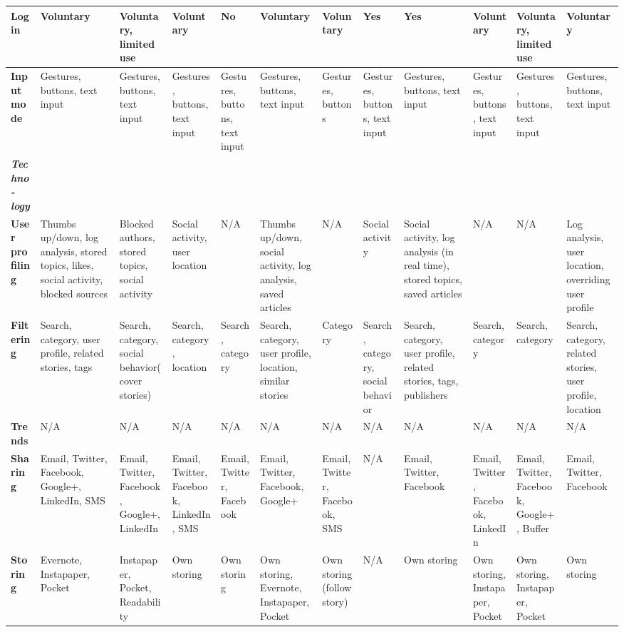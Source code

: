 \begin{landscape}
\begin{center}
\begin{longtable}{ | p{1.6cm} | p{1.6cm} | p{1.6cm} | p{1.6cm} | p{1.6cm} | p{1.6cm} | p{1.6cm} | p{1.6cm} | p{1.6cm} | p{1.6cm} | p{1.6cm} | p{1.6cm} |}
\textbf{Login} & Voluntary & Voluntary, limited use & Voluntary & No & Voluntary & Voluntary & Yes & Yes & Voluntary & Voluntary, limited use & Voluntary \\ \hline

\textbf{Input mode} & Gestures, buttons, text input & Gestures, buttons, text input & Gestures, buttons, text input & Gestures, buttons, text input & Gestures, buttons, text input & Gestures, buttons & Gestures, buttons, text input & Gestures, buttons, text input & Gestures, buttons, text input & Gestures, buttons, text input & Gestures, buttons, text input \\ \hline

\textit{\textbf{Techno-logy}} &&&&&&&&&&& \\ \hline

\textbf{User profiling} & Thumbs up/down, log analysis, stored topics, likes, social activity, blocked sources & Blocked authors, stored topics, social activity & Social activity, user location & N/A & Thumbs up/down, social activity, log analysis, saved articles & N/A & Social activity & Social activity, log analysis (in real time), stored topics, saved articles & N/A & N/A & Log analysis, user location, overriding user profile \\ \hline

\textbf{Filtering} & Search, category, user profile, related stories, tags & Search, category, social behavior(cover stories) & Search, category, location & Search, category & Search, category, user profile, location, similar stories & Category & Search, category, social behavior & Search, category, user profile, related stories, tags, publishers & Search, category & Search, category & Search, category, related stories, user profile, location  \\ \hline

\textbf{Trends} & N/A & N/A & N/A & N/A & N/A & N/A & N/A & N/A & N/A & N/A & N/A\\ \hline

\textbf{Sharing} & Email, Twitter, Facebook, Google+, LinkedIn, SMS & Email, Twitter, Facebook, Google+, LinkedIn & Email, Twitter, Facebook, LinkedIn, SMS & Email, Twitter, Facebook & Email, Twitter, Facebook, Google+ & Email, Twitter, Facebook, SMS & N/A & Email, Twitter, Facebook & Email, Twitter, Facebook, LinkedIn & Email, Twitter, Facebook, Google+, Buffer & Email, Twitter, Facebook \\ \hline

\textbf{Storing} & Evernote, Instapaper, Pocket & Instapaper, Pocket, Readability & Own storing & Own storing & Own storing, Evernote, Instapaper, Pocket & Own storing (follow story) & N/A & Own storing & Own storing, Instapaper, Pocket & Own storing, Instapaper, Pocket & Own storing \\ \hline

\end{longtable}
\end{center}
\end{landscape}

